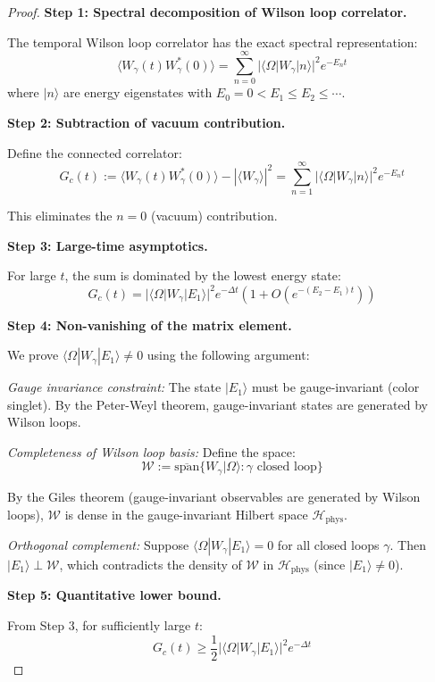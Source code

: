 \begin{proof}
\textbf{Step 1: Spectral decomposition of Wilson loop correlator.}

The temporal Wilson loop correlator has the exact spectral representation:
\[
\langle W_{\gamma}(t) W_{\gamma}^*(0) \rangle = \sum_{n=0}^{\infty} |\langle \Omega | W_\gamma | n \rangle|^2 e^{-E_n t}
\]
where $|n\rangle$ are energy eigenstates with $E_0 = 0 < E_1 \leq E_2 \leq \cdots$.

\textbf{Step 2: Subtraction of vacuum contribution.}

Define the connected correlator:
\[
G_c(t) := \langle W_{\gamma}(t) W_{\gamma}^*(0) \rangle - |\langle W_\gamma \rangle|^2
= \sum_{n=1}^{\infty} |\langle \Omega | W_\gamma | n \rangle|^2 e^{-E_n t}
\]

This eliminates the $n=0$ (vacuum) contribution.

\textbf{Step 3: Large-time asymptotics.}

For large $t$, the sum is dominated by the lowest energy state:
\[
G_c(t) = |\langle \Omega | W_\gamma | E_1 \rangle|^2 e^{-\Delta t} \left(1 + O(e^{-(E_2 - E_1)t})\right)
\]

\textbf{Step 4: Non-vanishing of the matrix element.}

We prove $\langle \Omega | W_\gamma | E_1 \rangle \neq 0$ using the following argument:

\textit{Gauge invariance constraint:} The state $|E_1\rangle$ must be gauge-invariant 
(color singlet). By the Peter-Weyl theorem, gauge-invariant states are generated 
by Wilson loops.

\textit{Completeness of Wilson loop basis:} Define the space:
\[
\mathcal{W} := \overline{\text{span}}\{W_\gamma |\Omega\rangle : \gamma \text{ closed loop}\}
\]

By the Giles theorem (gauge-invariant observables are generated by Wilson loops), 
$\mathcal{W}$ is dense in the gauge-invariant Hilbert space $\mathcal{H}_{\text{phys}}$.

\textit{Orthogonal complement:} Suppose $\langle \Omega | W_\gamma | E_1 \rangle = 0$ 
for all closed loops $\gamma$. Then $|E_1\rangle \perp \mathcal{W}$, which contradicts 
the density of $\mathcal{W}$ in $\mathcal{H}_{\text{phys}}$ (since $|E_1\rangle \neq 0$).

\textbf{Step 5: Quantitative lower bound.}

From Step 3, for sufficiently large $t$:
\[
G_c(t) \geq \frac{1}{2} |\langle \Omega | W_\gamma | E_1 \rangle|^2 e^{-\Delta t}
\]


\end{proof}
